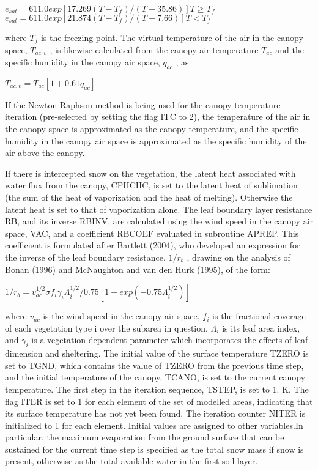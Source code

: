 $e_{sat} = 611.0 exp[17.269(T - T_f )/(T - 35.86)] T \geq T_f$ $e_{sat} = 611.0 exp[21.874(T - T_f )/(T - 7.66)] T < T_f$

where $T_f$ is the freezing point. The virtual temperature of the air in the canopy space, $T_{ac,v}$ , is likewise calculated from the canopy air temperature $T_{ac}$ and the specific humidity in the canopy air space, $q_{ac}$ , as

$T_{ac,v} = T_{ac} [1 + 0.61 q_{ac} ]$

If the Newton-\/\+Raphson method is being used for the canopy temperature iteration (pre-\/selected by setting the flag I\+T\+C to 2), the temperature of the air in the canopy space is approximated as the canopy temperature, and the specific humidity in the canopy air space is approximated as the specific humidity of the air above the canopy.

If there is intercepted snow on the vegetation, the latent heat associated with water flux from the canopy, C\+P\+H\+C\+H\+C, is set to the latent heat of sublimation (the sum of the heat of vaporization and the heat of melting). Otherwise the latent heat is set to that of vaporization alone. The leaf boundary layer resistance R\+B, and its inverse R\+B\+I\+N\+V, are calculated using the wind speed in the canopy air space, V\+A\+C, and a coefficient R\+B\+C\+O\+E\+F evaluated in subroutine A\+P\+R\+E\+P. This coefficient is formulated after Bartlett (2004), who developed an expression for the inverse of the leaf boundary resistance, $1/r_b$ , drawing on the analysis of Bonan (1996) and Mc\+Naughton and van den Hurk (1995), of the form\+:

$1/r_b = v_{ac}^{1/2} \sigma f_i \gamma_i \Lambda_i^{1/2} /0.75 [1 - exp(-0.75 \Lambda_i^{1/2})]$

where $v_{ac}$ is the wind speed in the canopy air space, $f_i$ is the fractional coverage of each vegetation type i over the subarea in question, $\Lambda_i$ is its leaf area index, and $\gamma_i$ is a vegetation-\/dependent parameter which incorporates the effects of leaf dimension and sheltering. The initial value of the surface temperature T\+Z\+E\+R\+O is set to T\+G\+N\+D, which contains the value of T\+Z\+E\+R\+O from the previous time step, and the initial temperature of the canopy, T\+C\+A\+N\+O, is set to the current canopy temperature. The first step in the iteration sequence, T\+S\+T\+E\+P, is set to 1. K. The flag I\+T\+E\+R is set to 1 for each element of the set of modelled areas, indicating that its surface temperature has not yet been found. The iteration counter N\+I\+T\+E\+R is initialized to 1 for each element. Initial values are assigned to other variables.\+In particular, the maximum evaporation from the ground surface that can be sustained for the current time step is specified as the total snow mass if snow is present, otherwise as the total available water in the first soil layer.

